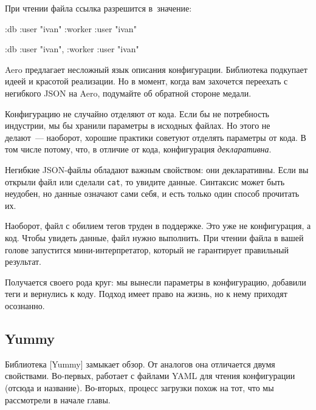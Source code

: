 \noindent
При чтении файла ссылка разрешится в~значение:

\ifnarrow

\begin{english}
  \begin{clojure}
{:db {:user "ivan"}
 :worker {:user "ivan"}}
  \end{clojure}
\end{english}

\else

\begin{english}
  \begin{clojure}
{:db {:user "ivan"}, :worker {:user "ivan"}}
  \end{clojure}
\end{english}

\fi

Aero предлагает несложный язык описания конфигурации. Библиотека подкупает идеей
и красотой реализации. Но в момент, когда вам захочется переехать с негибкого
JSON на Aero, подумайте об обратной стороне медали.


Конфигурацию не случайно отделяют от кода. Если бы не потребность индустрии, мы
бы хранили параметры в исходных файлах. Но этого не делают~--- наоборот, хорошие
практики советуют отделять параметры от кода. В том числе потому, что, в
отличие от кода, конфигурация \emph{декларативна}.

Негибкие JSON-файлы обладают важным свойством: они декларативны. Если вы открыли
файл или сделали \verb|cat|, то увидите данные. Синтаксис может быть неудобен,
но данные означают сами себя, и есть только один способ прочитать их.

Наоборот, файл с обилием тегов труден в поддержке. Это уже не конфигурация, а
код. Чтобы увидеть данные, файл нужно выполнить. При чтении файла в вашей голове
запустится мини-интерпретатор, который не гарантирует правильный результат.

Получается своего рода круг: мы вынесли параметры в конфигурацию, добавили теги
и вернулись к коду. Подход имеет право на жизнь, но к нему приходят осознанно.

\subsection{Yummy}


Библиотека [Yummy] замыкает обзор. От
аналогов она отличается двумя свойствами. Во-первых, работает с файлами YAML для
чтения конфигурации (отсюда и название). Во-вторых, процесс загрузки похож на
тот, что мы рассмотрели в начале главы.

